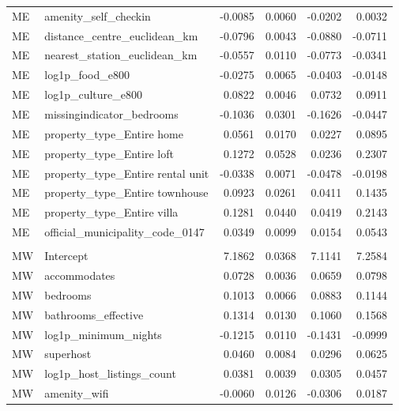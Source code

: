 \begin{landscape}
\begin{longtable}{>{\raggedright\arraybackslash}p{2cm}>{\raggedright\arraybackslash}p{9cm}rrrr}
ME & amenity\_\allowbreak{}self\_\allowbreak{}checkin & -0.0085 & 0.0060 & -0.0202 & 0.0032 \\
ME & distance\_\allowbreak{}centre\_\allowbreak{}euclidean\_\allowbreak{}km & -0.0796 & 0.0043 & -0.0880 & -0.0711 \\
ME & nearest\_\allowbreak{}station\_\allowbreak{}euclidean\_\allowbreak{}km & -0.0557 & 0.0110 & -0.0773 & -0.0341 \\
ME & log1p\_\allowbreak{}food\_\allowbreak{}e800 & -0.0275 & 0.0065 & -0.0403 & -0.0148 \\
ME & log1p\_\allowbreak{}culture\_\allowbreak{}e800 & 0.0822 & 0.0046 & 0.0732 & 0.0911 \\
ME & missingindicator\_\allowbreak{}bedrooms & -0.1036 & 0.0301 & -0.1626 & -0.0447 \\
ME & property\_\allowbreak{}type\_\allowbreak{}Entire home & 0.0561 & 0.0170 & 0.0227 & 0.0895 \\
ME & property\_\allowbreak{}type\_\allowbreak{}Entire loft & 0.1272 & 0.0528 & 0.0236 & 0.2307 \\
ME & property\_\allowbreak{}type\_\allowbreak{}Entire rental unit & -0.0338 & 0.0071 & -0.0478 & -0.0198 \\
ME & property\_\allowbreak{}type\_\allowbreak{}Entire townhouse & 0.0923 & 0.0261 & 0.0411 & 0.1435 \\
ME & property\_\allowbreak{}type\_\allowbreak{}Entire villa & 0.1281 & 0.0440 & 0.0419 & 0.2143 \\
ME & official\_\allowbreak{}municipality\_\allowbreak{}code\_\allowbreak{}0147 & 0.0349 & 0.0099 & 0.0154 & 0.0543 \\
\addlinespace[0.5em]
\multicolumn{6}{l}{\textbf{MW}} \\
MW & Intercept & 7.1862 & 0.0368 & 7.1141 & 7.2584 \\
MW & accommodates & 0.0728 & 0.0036 & 0.0659 & 0.0798 \\
MW & bedrooms & 0.1013 & 0.0066 & 0.0883 & 0.1144 \\
MW & bathrooms\_\allowbreak{}effective & 0.1314 & 0.0130 & 0.1060 & 0.1568 \\
MW & log1p\_\allowbreak{}minimum\_\allowbreak{}nights & -0.1215 & 0.0110 & -0.1431 & -0.0999 \\
MW & superhost & 0.0460 & 0.0084 & 0.0296 & 0.0625 \\
MW & log1p\_\allowbreak{}host\_\allowbreak{}listings\_\allowbreak{}count & 0.0381 & 0.0039 & 0.0305 & 0.0457 \\
MW & amenity\_\allowbreak{}wifi & -0.0060 & 0.0126 & -0.0306 & 0.0187 \\

\end{longtable}
\end{landscape}
